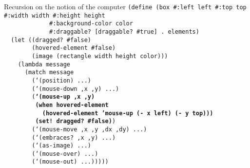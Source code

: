 \begin{frame}{Recursion on the notion of the computer}
  \tiny
  \texttt{(define (box \#:left left \#:top top \#:width width \#:height height\\
    \ \ \ \ \ \ \ \ \ \ \ \ \ \#:background-color color\\
    \ \ \ \ \ \ \ \ \ \ \ \ \ \#:draggable? [draggable? \#true] . elements)\\
    \ \ (let ((dragged? \#false)\\
    \ \ \ \ \ \ \ \ (hovered-element \#false)\\
    \ \ \ \ \ \ \ \ (image (rectangle width height color)))\\
    \ \ \ \ (lambda message\\
    \ \ \ \ \ \ (match message\\
    \ \ \ \ \ \ \ \ (`(position) ...)\\
    \ \ \ \ \ \ \ \ (`(mouse-down ,x ,y) ...)\\
    \ \ \ \ \ \ \ \ (\textbf{`(mouse-up ,x ,y)\\
      \ \ \ \ \ \ \ \ \ (when hovered-element\\
      \ \ \ \ \ \ \ \ \ \ \ (hovered-element 'mouse-up (- x left) (- y top)))\\
      \ \ \ \ \ \ \ \ \ (set! dragged? \#false)})\\
    \ \ \ \ \ \ \ \ (`(mouse-move ,x ,y ,dx ,dy) ...)\\
    \ \ \ \ \ \ \ \ (`(embraces? ,x ,y) ...)\\
    \ \ \ \ \ \ \ \ (`(as-image) ...)\\
    \ \ \ \ \ \ \ \ (`(mouse-over) ...)\\
    \ \ \ \ \ \ \ \ (`(mouse-out) ...)))))\\
    \ \\
    \ \\
    \ \\
    \ \\
    \ \\
    \ \\
    \ \\
    \ \\
    \ 
    }
\end{frame}

